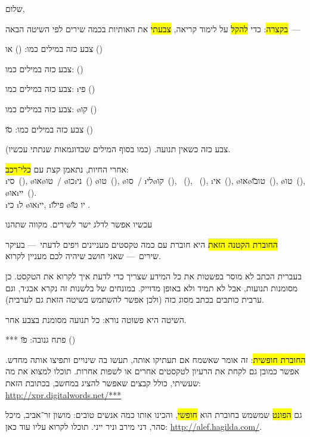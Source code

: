 שלום,

\begin{framed}
\hl{בקצרה}: כדי \hl{להקל} על לימוד קריאה, \hl{צבעתי} את האותיות בכמה שירים לפי השיטה הבאה~—
\begin{compactitem}
	\item צבע כזה  במילים כמו:  () או  ()
	\item צבע כזה  במילים כמו:  ()
	\item צבע כזה  במילים כמו: \i{פי} ()
	\item צבע כזה  במילים כמו: \o{קו} ()
	\item צבע כזה  במילים כמו: \u{סו} ()
	\item צבע כזה  כשאין תנועה. (כמו בסוף המילים שבדוגמאות שנתתי עכשיו).
\end{compactitem}

אחרי החיות, נתאמן קצת עם \hl{כלי־רכב}:\\
\i{סי}~(),
\o{או}\o{טו}~/ \o{כו}\i{ני}~()
\o{טו}~(),
\o{סו}~/ \i{לי}\o{קו}~(),
~(),
~(),
\i{אי}~(),
\o{או}\o{טו}\u{בו}~(),
\o{טו}~(),
\o{או}\i{יי}~().\\
\i{כי}  \i{ל}  \o{או}\i{יי},  \i{פי}\u{לו} \o{יו}  \u{טו} .

עכשיו אפשר לדלג ישר לשירים. מקווה שתהנו 
\end{framed}

\hl{החוברת הקטנה הזאת} היא חוברת עם כמה טקסטים מעניינים ויפים לדעתי~— בעיקר שירים~— שאני חושב שיהיה לכם מעניין לקרוא.

בעברית הכתב לא מוסר בפשטות את כל המידע שצריך כדי לדעת איך לקרוא את הטקסט. כן מסומנות תנועות, אבל לא תמיד ולא באופן מדוייק. במונחים של בלשנות זה נקרא אבג׳ד, וגם ערבית כותבים בכתב מסוג כזה (ולכן אפשר להשתמש בשיטה הזאת גם לערבית).

השיטה היא פשוטה נורא: כל תנועה מסומנת בצבע אחר.

*** פתח גנובה: \u{פו}\gnuva {} ()

\hl{החוברת חופשית}: זה אומר שאשמח אם תעתיקו אותה, תעשו בה שינויים ותפיצו אותה מחדש. אפשר כמובן גם לקחת את הרעיון לטקסטים אחרים או לשפות אחרות. תוכלו למצוא את מה שעשיתי, כולל קבצים שאפשר להציג במחשב, בכתובת הזאת: \url{http://xpr.digitalwords.net/***}

גם \hl{הפונט} שמשמש בחוברת הוא \hl{חופשי}, והכינו אותו כמה אנשים טובים: מושון זר־אביב, מיכל סהר, דני מירב וניר ייני. תוכלו לקרוא עליו עוד כאן: \url{http://alef.hagilda.com/}.
